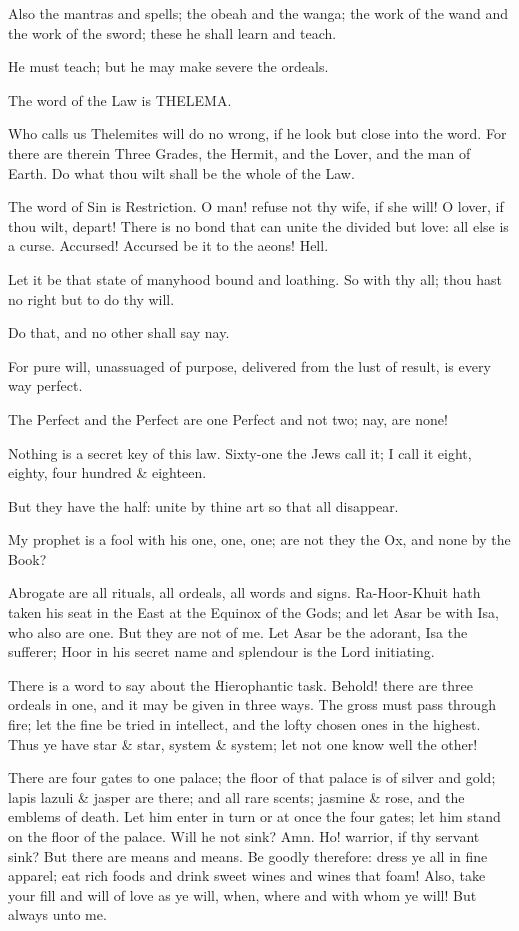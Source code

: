 Also the mantras and spells; the obeah and the wanga; the work of the wand and the work of the sword; these he shall learn and teach.

He must teach; but he may make severe the ordeals.

The word of the Law is THELEMA.

Who calls us Thelemites will do no wrong, if he look but close into the word. For there are therein Three Grades, the Hermit, and the Lover, and the man of Earth. Do what thou wilt shall be the whole of the Law.

The word of Sin is Restriction. O man! refuse not thy wife, if she will! O lover, if thou wilt, depart! There is no bond that can unite the divided but love: all else is a curse. Accursed! Accursed be it to the aeons! Hell.

Let it be that state of manyhood bound and loathing. So with thy all; thou hast no right but to do thy will.

Do that, and no other shall say nay.

For pure will, unassuaged of purpose, delivered from the lust of result, is every way perfect.

The Perfect and the Perfect are one Perfect and not two; nay, are none!

Nothing is a secret key of this law. Sixty-one the Jews call it; I call it eight, eighty, four hundred \& eighteen.

But they have the half: unite by thine art so that all disappear.

My prophet is a fool with his one, one, one; are not they the Ox, and none by the Book?

Abrogate are all rituals, all ordeals, all words and signs. Ra-Hoor-Khuit hath taken his seat in the East at the Equinox of the Gods; and let Asar be with Isa, who also are one. But they are not of me. Let Asar be the adorant, Isa the sufferer; Hoor in his secret name and splendour is the Lord initiating.

There is a word to say about the Hierophantic task. Behold! there are three ordeals in one, and it may be given in three ways. The gross must pass through fire; let the fine be tried in intellect, and the lofty chosen ones in the highest. Thus ye have star \& star, system \& system; let not one know well the other!

There are four gates to one palace; the floor of that palace is of silver and gold; lapis lazuli \& jasper are there; and all rare scents; jasmine \& rose, and the emblems of death. Let him enter in turn or at once the four gates; let him stand on the floor of the palace. Will he not sink? Amn. Ho! warrior, if thy servant sink? But there are means and means. Be goodly therefore: dress ye all in fine apparel; eat rich foods and drink sweet wines and wines that foam! Also, take your fill and will of love as ye will, when, where and with whom ye will! But always unto me.

